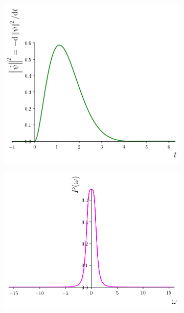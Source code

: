 \begin{figure}
  \centering
  \begin{subfigure}[b]{0.49\textwidth}
    \includegraphics[width=\linewidth]{img/2ldetect/qubit_normalization_loss.png}
    \subcaption{}\label{fig:absorbed-qubit-normalization-loss:t}
  \end{subfigure}
  \begin{subfigure}[b]{0.49\textwidth}
    \includegraphics[width=\linewidth]{img/2ldetect/P_omega.png}
    \subcaption{}\label{fig:absorbed-qubit-normalization-loss:omega}

\end{subfigure}
\end{figure}
